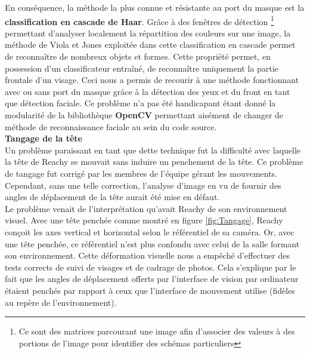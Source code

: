 \documentclass[a4paper,french]{article}
\begin{document}
En conséquence, la méthode la plus connue et résistante au port du masque est la \textbf{classification en cascade de Haar}. Grâce à des fenêtres de détection \footnote{Ce sont des matrices parcourant une image afin d'associer des valeurs à des portions de l'image pour identifier des schémas particuliers} permettant d'analyser localement la répartition des couleurs sur une image, la méthode de Viola et Jones exploitée dans cette classification en cascade permet de reconnaître de nombreux objets et formes. Cette propriété permet, en possession d'un classificateur entraîné, de reconnaître uniquement la partie frontale d'un visage. Ceci nous a permis de recourir à une méthode fonctionnant avec ou sans port du masque grâce à la détection des yeux et du front en tant que détection faciale. Ce problème n'a pas été handicapant étant donné la modularité de la bibliothèque \textbf{OpenCV} permettant aisément de changer de méthode de reconnaissance faciale au sein du code source. \\

\textbf{Tangage de la tête}\\

Un problème paraissant en tant que dette technique fut la difficulté avec laquelle la tête de Reachy se mouvait sans induire un penchement de la tête. Ce problème de tangage fut corrigé par les membres de l'équipe gérant les mouvements. Cependant, sans une telle correction, l'analyse d'image en vu de fournir des angles de déplacement de la tête aurait été mise en défaut.\\

Le problème venait de l'interprétation qu'avait Reachy de son environnement visuel. Avec une tête penchée comme montré en figure \ref{fig:Tangage}, Reachy conçoit les axes vertical et horizontal selon le référentiel de sa caméra. Or, avec une tête penchée, ce référentiel n'est plus confondu avec celui de la salle formant son environnement. Cette déformation visuelle nous a empêché d'effectuer des tests corrects de suivi de visages et de cadrage de photos. Cela s'explique par le fait que les angles de déplacement offerts par l'interface de vision par ordinateur étaient penchés par rapport à ceux que l'interface de mouvement utilise (fidèles au repère de l'environnement).
\end{document}
